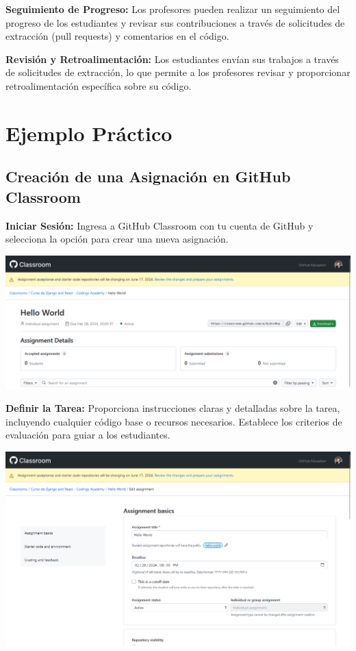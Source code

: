 \documentclass[
  a4paper,
  DIV=11,
  numbers=noendperiod,
  onepage,
  openany]{scrreprt}
\begin{document}
\textbf{Seguimiento de Progreso:} Los profesores pueden realizar un
seguimiento del progreso de los estudiantes y revisar sus contribuciones
a través de solicitudes de extracción (pull requests) y comentarios en
el código.

\textbf{Revisión y Retroalimentación:} Los estudiantes envían sus
trabajos a través de solicitudes de extracción, lo que permite a los
profesores revisar y proporcionar retroalimentación específica sobre su
código.

\section{Ejemplo Práctico}\label{ejemplo-pruxe1ctico}

\subsection{Creación de una Asignación en GitHub Classroom
📒}\label{creaciuxf3n-de-una-asignaciuxf3n-en-github-classroom}

\textbf{Iniciar Sesión:} Ingresa a GitHub Classroom con tu cuenta de
GitHub y selecciona la opción para crear una nueva asignación.

\begin{center}
\includegraphics{unidades/unidad0/images/paste-2.png}
\end{center}

\textbf{Definir la Tarea:} Proporciona instrucciones claras y detalladas
sobre la tarea, incluyendo cualquier código base o recursos necesarios.
Establece los criterios de evaluación para guiar a los estudiantes.

\begin{center}
\includegraphics{unidades/unidad0/images/paste-1.png}
\end{center}
\end{document}
